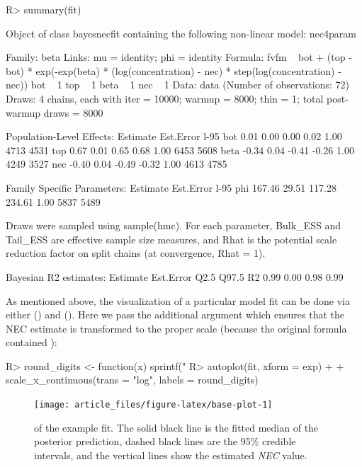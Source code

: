 \documentclass[
  shortnames]{jss}
\begin{document}
\begin{CodeChunk}
\begin{CodeInput}
R> summary(fit)
\end{CodeInput}
\begin{CodeOutput}
Object of class bayesnecfit containing the following non-linear model: nec4param

 Family: beta 
  Links: mu = identity; phi = identity 
Formula: fvfm ~ bot + (top - bot) * exp(-exp(beta) * (log(concentration) - nec) * step(log(concentration) - nec)) 
         bot ~ 1
         top ~ 1
         beta ~ 1
         nec ~ 1
   Data: data (Number of observations: 72) 
  Draws: 4 chains, each with iter = 10000; warmup = 8000; thin = 1;
         total post-warmup draws = 8000

Population-Level Effects: 
     Estimate Est.Error l-95%
bot      0.01      0.00     0.00     0.02 1.00     4713     4531
top      0.67      0.01     0.65     0.68 1.00     6453     5608
beta    -0.34      0.04    -0.41    -0.26 1.00     4249     3527
nec     -0.40      0.04    -0.49    -0.32 1.00     4613     4785

Family Specific Parameters: 
    Estimate Est.Error l-95%
phi   167.46     29.51   117.28   234.61 1.00     5837     5489

Draws were sampled using sample(hmc). For each parameter, Bulk_ESS
and Tail_ESS are effective sample size measures, and Rhat is the potential
scale reduction factor on split chains (at convergence, Rhat = 1).


Bayesian R2 estimates:
   Estimate Est.Error Q2.5 Q97.5
R2     0.99      0.00 0.98  0.99
\end{CodeOutput}
\end{CodeChunk}

As mentioned above, the visualization of a particular model fit can be done via either   () and  \citep{ggplot} (). Here we pass the additional argument  which ensures that the NEC estimate is transformed to the proper scale (because the original formula contained ):

\begin{CodeChunk}
\begin{CodeInput}
R> round_digits <- function(x) sprintf("%
R> autoplot(fit, xform = exp) +
+   scale_x_continuous(trans = "log", labels = round_digits)
\end{CodeInput}
\begin{figure}[!ht]

{\centering \texttt{[image: article\_files/figure-latex/base-plot-1]} 

}

\caption{  of the example fit. The solid black line is the fitted median of the posterior prediction, dashed black lines are the 95\% credible intervals, and the vertical lines show the estimated \textit{NEC} value.}\label{fig:base-plot}
\end{figure}
\end{CodeChunk}
\end{document}

